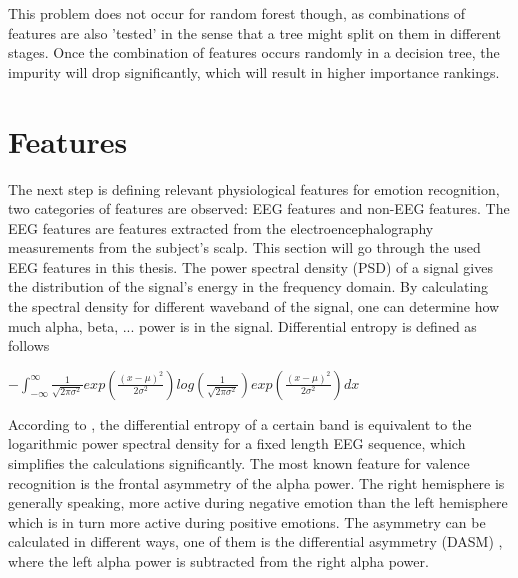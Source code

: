 \npar

This problem does not occur for random forest though, as combinations of features are also 'tested' in the sense that a tree might split on them in different stages. Once the combination of features occurs randomly in a decision tree, the impurity will drop significantly, which will result in higher importance rankings.




\section{Features}
\label{featuresExplained}
The next step is defining relevant physiological features for emotion recognition, two categories of features are observed: EEG features and non-EEG features.
The EEG features are features extracted from the electroencephalography measurements from the subject's scalp. This section will go through the used EEG features in this thesis.
\npar
The power spectral density (PSD)  of a signal gives the distribution of the signal's energy in the frequency domain. By calculating the spectral density for different waveband of the signal, one can determine how much alpha, beta, ... power is in the signal.
\npar
Differential entropy is defined as follows \citep{killyPaper} \\
\begin{center}
$ - \int_{-\infty}^{\infty} \frac{1}{\sqrt{2\pi\sigma^2}} exp(\frac{(x-\mu)^2}{2\sigma^2}) log(\frac{1}{\sqrt{2\pi\sigma^2}}) exp(\frac{(x-\mu)^2}{2\sigma^2})dx$
\end{center}
According to \citep{diffEnt}, the differential entropy of a certain band is equivalent to the logarithmic power spectral density for a fixed length EEG sequence, which simplifies the calculations significantly.
\npar
The most known feature for valence recognition is the frontal asymmetry of the alpha power\cite{GivenPaper}.
The right hemisphere is generally speaking, more active during negative emotion than the left hemisphere which is in turn more active during positive emotions\cite{RealTimeEEGEmotion,EEGDatasets,killyPaper}. The asymmetry can be calculated in different ways, one of them is the differential asymmetry (DASM) , where the left alpha power is subtracted from the right alpha power.
